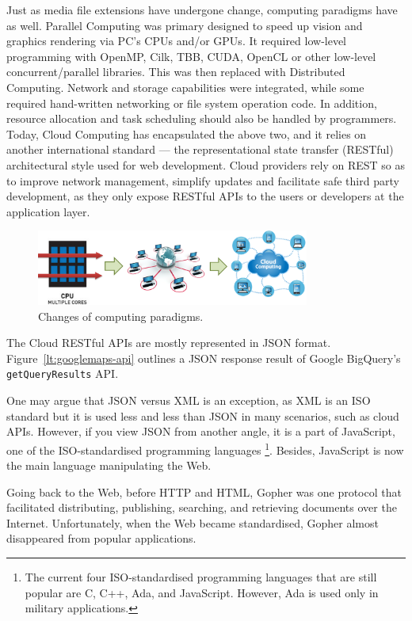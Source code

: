 Just as media file extensions have undergone change, computing paradigms have as well. 
Parallel Computing was primary designed to speed up vision and graphics rendering via PC's CPUs and/or GPUs. It required low-level programming with OpenMP, Cilk, TBB, CUDA, OpenCL or other low-level concurrent/parallel libraries. This was then replaced with Distributed Computing. Network and storage capabilities were integrated, while some required hand-written networking or file system operation code. In addition, resource allocation and task scheduling should also be handled by programmers. Today, Cloud Computing has encapsulated the above two, and it relies on another international standard --- the representational state transfer (RESTful) architectural style used for web development. Cloud providers rely on REST so as to improve network management, simplify updates and facilitate safe third party development, as they only expose RESTful APIs to the users or developers at the application layer. 
\begin{figure}[ht]
	\centering
	\includegraphics[width=0.80\textwidth]{fig/decisions/parallel-to-cloud.png} 
	\caption{Changes of computing paradigms.}\label{fig:parallel-to-cloud}
\end{figure}

The Cloud RESTful APIs are mostly represented in JSON format. Figure~\ref{lt:googlemaps-api} outlines a JSON response result of Google BigQuery's \texttt{getQueryResults} API. 


One may argue that JSON versus XML is an exception, as XML is an ISO standard but it is used less and less than JSON in many scenarios, such as cloud APIs. However, if you view JSON from another angle, it is a part of JavaScript, one of the ISO-standardised programming languages \cite{ecmascriptiso} \footnote{The current four ISO-standardised programming languages that are still popular are C, C++, Ada, and JavaScript. However, Ada is used only in military applications.}. Besides, JavaScript is now the main language manipulating the Web. 

Going back to the Web, before HTTP and HTML, Gopher was one protocol that facilitated distributing, publishing, searching, and retrieving documents over the Internet. Unfortunately, when the Web became standardised, Gopher almost disappeared from popular applications. 

